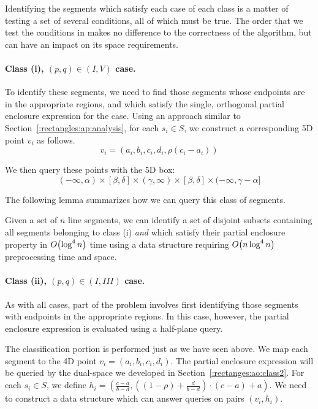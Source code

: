Identifying the segments which satisfy each case of each class is a matter of testing a set of several conditions, all of which must be true. The order that we test the conditions in makes no difference to the correctness of the algorithm, but can have an impact on its space requirements.

\paragraph{Class (i), $(p, q) \in (I, V)$ case.} 
To identify these segments, we need to find those segments whose endpoints are in the appropriate regions, and which satisfy the single, orthogonal partial enclosure expression for the case. 
Using an approach similar to Section~\ref{:rectangles:ap:analysis}, for each $s_i \in S$, we construct a corresponding 5D point $v_i$ as follows.
\[
v_i = (a_i, b_i, c_i, d_i, \rho(c_i - a_i))
\]

\noindent We then query these points with the 5D box:
\[
(-\infty, \alpha) \times [\beta, \delta] \times (\gamma, \infty) \times [\beta, \delta] \times (-\infty, \gamma - \alpha]
\]

\noindent The following lemma summarizes how we can query this class of segments.

\begin{lemma}
\label{lem:ao:class1:v}
Given a set of $n$ line segments, we can identify a set of disjoint subsets containing all segments belonging to class (i) \emph{and} which satisfy their partial enclosure property in $O\!\left(\log^4{n}\right)$ time using a data structure requiring $O\!\left(n\log^4{n}\right)$ preprocessing time and space.
\end{lemma}

\paragraph{Class (ii), $(p, q) \in (I, III)$ case.} 
As with all cases, part of the problem involves first identifying those segments with endpoints in the appropriate regions.
In this case, however, the partial enclosure expression is evaluated using a half-plane query.

The classification portion is performed just as we have seen above. We map each segment to the 4D point $v_i = ( a_i, b_i, c_i, d_i )$.
The partial enclosure expression will be queried by the dual-space we developed in Section~\ref{:rectanges:ao:class2}. 
For each $s_i \in S$, we define $h_i = \left ( \frac{c - a}{b - d}, \left ( (1 - \rho) + \frac{d}{b-d} \right ) \cdot (c-a) + a \right )$.
We need to construct a data structure which can answer queries on pairs $(v_i, h_i)$.

